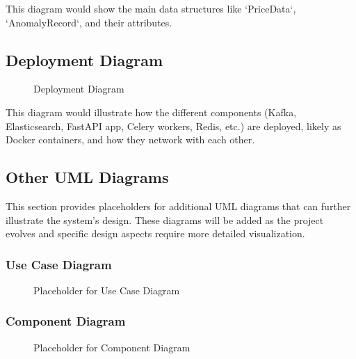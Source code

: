 This diagram would show the main data structures like `PriceData`, `AnomalyRecord`, and their attributes.

\subsection{Deployment Diagram}

\begin{figure}[H]
    \centering
    \caption{Deployment Diagram}
    \label{fig:deployment_diagram}
\end{figure}

This diagram would illustrate how the different components (Kafka, Elasticsearch, FastAPI app, Celery workers, Redis, etc.) are deployed, likely as Docker containers, and how they network with each other.

\subsection{Other UML Diagrams}
This section provides placeholders for additional UML diagrams that can further illustrate the system's design. These diagrams will be added as the project evolves and specific design aspects require more detailed visualization.

\subsubsection{Use Case Diagram}
\begin{figure}[h!]
    \centering
    \caption{Placeholder for Use Case Diagram}
    \label{fig:placeholder_use_case_diagram}
\end{figure}

\subsubsection{Component Diagram}
\begin{figure}[h!]
    \centering
    \caption{Placeholder for Component Diagram}
    \label{fig:placeholder_component_diagram}
\end{figure}


